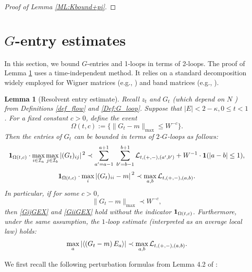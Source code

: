 \documentclass[10pt,reqno]{article}
\theoremstyle{plain} %
\newtheorem{lemma}[theorem]{Lemma}
\theoremstyle{remark}
\numberwithin{equation}{section}
\begin{document}
\begin{proof}[Proof of Lemma  \ref{ML:Kbound+pi}]
\end{proof}
 





\section{\texorpdfstring{$G$}{G}-entry estimates}
In this section, we bound $G$-entries and 1-loops in terms of 2-loops. The proof of Lemma \ref{lem_GbEXP} uses a time-independent method.
It relies on a standard decomposition widely employed for Wigner matrices (e.g., \cite{erdHos2012rigidity}) and band matrices (e.g., \cite{Average_fluc}).


\begin{lemma}[Resolvent entry estimate]\label{lem_GbEXP}  
Recall   $z_t$ and  $G_t$ (which depend on  $N$ ) from  Definitions \ref{def_flow} and \ref{Def:G_loop}. 
Suppose that $|E| < 2 - \kappa, 0 \leq t <  1$.
For a fixed constant $c > 0$, define the event
\begin{equation}\label{def_asGMc}
    \Omega(t, c) := \big\{\|G_t - m\|_{\max} \leq W^{-c} \big\}.
\end{equation}
Then the entries of $G_t$ can be bounded in terms of $2$-$G$-loops as follows:
\begin{equation}\label{GijGEX}
    {\bf 1}_{\Omega(t, c)} \cdot \max_{i \in {\cal I}_a} \max_{j \in {\cal I}_b} |(G_t)_{ij}|^{\,2} \prec 
    \sum_{a' = a - 1}^{a + 1} \; \sum_{b' = b - 1}^{b + 1} {\cal L}_{t, (+,-), (a', b')}
    + W^{-1} \cdot {\bf 1}(|a - b| \leq 1),
\end{equation}
\begin{equation}\label{GiiGEX}
    {\bf 1}_{\Omega(t, c)} \cdot \max_{i} \left|(G_t)_{ii} - m\right|^{\,2} \prec \max_{a, b} {\cal L}_{t, (+,-), (a, b)}.
\end{equation}
 In particular, if for some $c > 0$, 
\begin{equation}\label{asGMc} 
    \|G_t - m\|_{\max} \prec W^{-c},
\end{equation}
then \eqref{GijGEX} and \eqref{GiiGEX} hold without the indicator ${\bf 1}_{\Omega(t, c)}$. 
Furthermore, under the same assumption, the $1$-loop estimate (interpreted as an average local law) holds:
\begin{equation}\label{GavLGEX}
    \max_{a} \left| \left\langle \left(G_t - m\right) E_a \right\rangle \right| \prec \max_{a, b} {\cal L}_{t, (+,-), (a, b)}.
\end{equation} 
\end{lemma}
 We first recall the following perturbation formulas from  Lemma 4.2 of \cite{erdHos2012bulk}:
\end{document}

